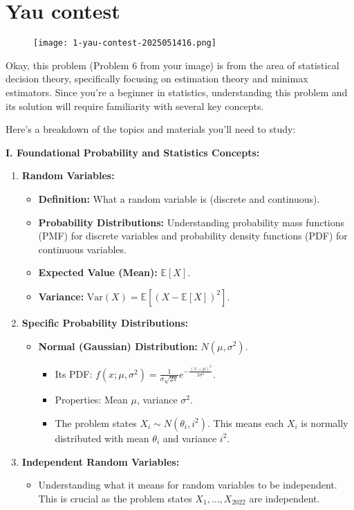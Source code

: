 \section{Yau contest}

\begin{figure}[H]
\centering
\texttt{[image: 1-yau-contest-2025051416.png]}
\label{}
\end{figure}

Okay, this problem (Problem 6 from your image) is from the area of statistical decision theory, specifically focusing on estimation theory and minimax estimators. Since you're a beginner in statistics, understanding this problem and its solution will require familiarity with several key concepts.

Here's a breakdown of the topics and materials you'll need to study:

\textbf{I. Foundational Probability and Statistics Concepts:}

\begin{enumerate}
	\item \textbf{Random Variables:}
	\begin{itemize}
		\item \textbf{Definition:} What a random variable is (discrete and continuous).
		\item \textbf{Probability Distributions:} Understanding probability mass functions (PMF) for discrete variables and probability density functions (PDF) for continuous variables.
		\item \textbf{Expected Value (Mean):} $\mathbb{E}[X]$.
		\item \textbf{Variance:} $\text{Var}(X) = \mathbb{E}[(X - \mathbb{E}[X])^2]$.
	\end{itemize}
	\item \textbf{Specific Probability Distributions:}
	\begin{itemize}
		\item \textbf{Normal (Gaussian) Distribution:} $N(\mu, \sigma^2)$.
		\begin{itemize}
			\item Its PDF: $f(x; \mu, \sigma^2) = \frac{1}{\sigma\sqrt{2\pi}} e^{-\frac{(x-\mu)^2}{2\sigma^2}}$.
			\item Properties: Mean $\mu$, variance $\sigma^2$.
			\item The problem states $X_i \sim N(\theta_i, i^2)$. This means each $X_i$ is normally distributed with mean $\theta_i$ and variance $i^2$.
		\end{itemize}
	\end{itemize}
	\item \textbf{Independent Random Variables:}
	\begin{itemize}
		\item Understanding what it means for random variables to be independent. This is crucial as the problem states $X_1, \ldots, X_{2022}$ are independent.
	\end{itemize}
\end{enumerate}

